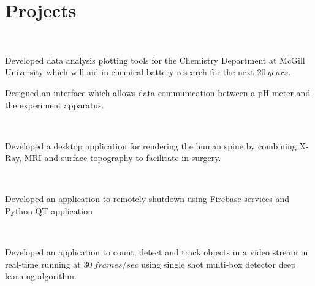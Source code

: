 \documentclass[]{sumbal-resume}
\begin{document}
\sectionsep

\section{Projects}

 \\
\begin{tightemize}
\item Developed data analysis plotting tools for the Chemistry Department at McGill University which will aid in chemical battery research for the next $20 \ years$. 
\item Designed an interface which allows data communication between a pH meter and the experiment apparatus. 
\end{tightemize}

 \\
\begin{tightemize}
\item Developed a desktop application for rendering the human spine by combining X-Ray, MRI and surface topography to facilitate in surgery. 
\end{tightemize}

 \\
\begin{tightemize}
\item Developed an application to remotely shutdown using Firebase services and Python QT application
\end{tightemize}

 \\
\begin{tightemize}
\item Developed an application to count, detect and track objects in a video stream in real-time running at $30 \ frames/sec$ using single shot multi-box detector deep learning algorithm.
\end{tightemize}
\end{document}
